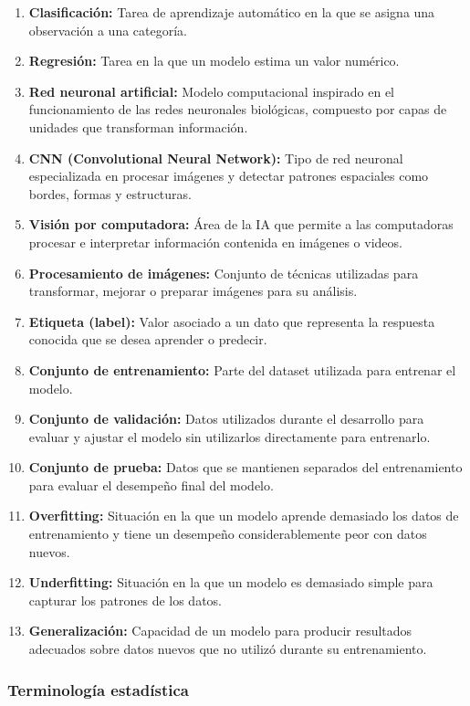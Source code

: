 \begin{enumerate}
  \item \textbf{Clasificación:} Tarea de aprendizaje automático en la que se asigna una observación a una categoría.
  \item \textbf{Regresión:} Tarea en la que un modelo estima un valor numérico.
  \item \textbf{Red neuronal artificial:} Modelo computacional inspirado en el funcionamiento de las redes neuronales biológicas, compuesto por capas de unidades que transforman información.
  \item \textbf{CNN (Convolutional Neural Network):} Tipo de red neuronal especializada en procesar imágenes y detectar patrones espaciales como bordes, formas y estructuras.
  \item \textbf{Visión por computadora:} Área de la IA que permite a las computadoras procesar e interpretar información contenida en imágenes o videos.
  \item \textbf{Procesamiento de imágenes:} Conjunto de técnicas utilizadas para transformar, mejorar o preparar imágenes para su análisis.
  \item \textbf{Etiqueta (label):} Valor asociado a un dato que representa la respuesta conocida que se desea aprender o predecir.
  \item \textbf{Conjunto de entrenamiento:} Parte del dataset utilizada para entrenar el modelo.
  \item \textbf{Conjunto de validación:} Datos utilizados durante el desarrollo para evaluar y ajustar el modelo sin utilizarlos directamente para entrenarlo.
  \item \textbf{Conjunto de prueba:} Datos que se mantienen separados del entrenamiento para evaluar el desempeño final del modelo.
  \item \textbf{Overfitting:} Situación en la que un modelo aprende demasiado los datos de entrenamiento y tiene un desempeño considerablemente peor con datos nuevos.
  \item \textbf{Underfitting:} Situación en la que un modelo es demasiado simple para capturar los patrones de los datos.
  \item \textbf{Generalización:} Capacidad de un modelo para producir resultados adecuados sobre datos nuevos que no utilizó durante su entrenamiento.
\end{enumerate}

\subsubsection{Terminología estadística}

